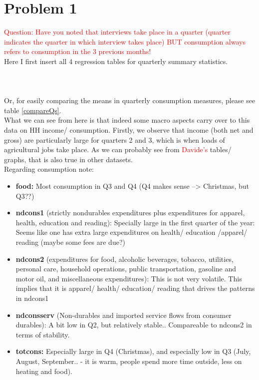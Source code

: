 \documentclass[12pt,a4paper]{article}
\begin{document}
\newpage


\section*{Problem 1}

\textcolor{red}{Question: Have you noted that interviews take place in a quarter (quarter indicates the quarter in which interview takes place) BUT consumption always refers to consumption in the 3 previous months!} \\

Here I first insert all 4 regression tables for quarterly summary statistics.
\\
\\
\\
\\

Or, for easily comparing the means in quarterly consumption measures, please see table \ref{compareQs}. \\



What we can see from here is that indeed some macro aspects carry over to this data on HH income/ consumption. Firstly, we observe that income (both net and gross) are particularly large for quarters 2 and 3, which is when loads of agricultural jobs take place. As we can probably see from \textcolor{red}{Davide's} tables/ graphs, that is also true in other datasets. \\

Regarding consumption note:
\begin{itemize}
    \item \textbf{food:} Most consumption in Q3 and Q4 (Q4 makes sense --> Christmas, but Q3??)
    \item \textbf{ndcons1} (strictly nondurables expenditures plus expenditures for apparel, health, education and reading): Specially large in the first quarter of the year: Seems like one has extra large expenditures on health/ education /apparel/ reading (maybe some fees are due?)
    \item \textbf{ndcons2} (expenditures for food, alcoholic beverages, tobacco, utilities, personal care, household operations, public transportation, gasoline and motor oil, and miscellaneous expenditures): This is not very volatile. This implies that it is apparel/ health/ education/ reading that drives the patterns in ndcons1
    \item \textbf{ndconsserv} (Non-durables and imported service flows from consumer durables): A bit low in Q2, but relatively stable.. Compareable to ndcons2 in terms of stability. 
    \item \textbf{totcons:} Especially large in Q4 (Christmas), and especially low in Q3 (July, August, September.. - it is warm, people spend more time outside, less on heating and food). 
\end{itemize}
\end{document}
